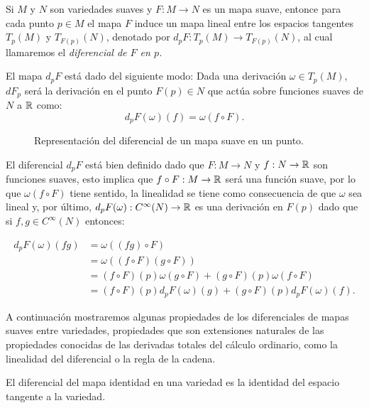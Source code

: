 \begin{definition}
	Si $M$ y $N$ son variedades suaves y $F: M \to N$ es un mapa suave, entonce para cada punto $p \in M$ el mapa $F$ induce un mapa lineal entre los espacios tangentes $T_p(M)$ y $T_{F(p)}(N)$, denotado por $d_pF: T_p(M) \to T_{F(p)}(N)$, al cual llamaremos el \it{diferencial de $F$ en $p$}.

	El mapa $d_pF$ está dado del siguiente modo: Dada una derivación $\omega \in T_p(M)$, $dF_p$ será la derivación en el punto $F(p) \in N$ que actúa sobre funciones suaves de $N$ a $\mathbb{R}$ como:
	\[ d_pF(\omega)(f) = \omega(f \circ F). \]
\end{definition}

\begin{figure}[h]
	\centering
	
	\caption{Representación del diferencial de un mapa suave en un punto.}
\end{figure}

El diferencial $d_pF$ está bien definido dado que $F: M \to N$ y $f: N \to \mathbb{R}$ son funciones suaves, esto implica que $f \circ F: M \to \mathbb{R}$ será una función suave, por lo que $\omega(f \circ F)$ tiene sentido, la linealidad se tiene como consecuencia de que $\omega$ sea lineal y, por último, $d_pF(\omega): C^{\infty}(N) \to \mathbb{R}$ es una derivación en $F(p)$ dado que si $f, g \in C^{\infty}(N)$ entonces:

\begin{align*}
	d_pF(\omega)(fg) & = \omega((fg) \circ F)                                               \\
	                 & = \omega((f \circ F)(g \circ F))                                     \\
	                 & = (f \circ F)(p)\omega(g \circ F) + (g \circ F)(p) \omega(f \circ F) \\
	                 & = (f \circ F)(p)d_pF(\omega)(g) + (g \circ F)(p)d_pF(\omega)(f).
\end{align*}

A continuación mostraremos algunas propiedades de los diferenciales de mapas suaves entre variedades, propiedades que son extensiones naturales de las propiedades conocidas de las derivadas totales del cálculo ordinario, como la linealidad del diferencial o la regla de la cadena.

\begin{lemma}\label{Lemma: Diferencial del Mapa Identidad}
	El diferencial del mapa identidad en una variedad es la identidad del espacio tangente a la variedad.
\end{lemma}

